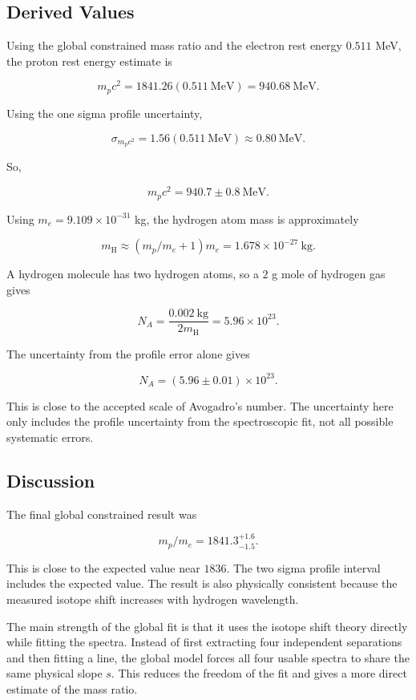 \documentclass[11pt]{article}
\begin{document}
\subsection{Derived Values}

Using the global constrained mass ratio and the electron rest energy \(0.511\) MeV, the proton rest energy estimate is

\[
m_p c^2
=
1841.26(0.511 \ \mathrm{MeV})
=
940.68 \ \mathrm{MeV}.
\]

Using the one sigma profile uncertainty,

\[
\sigma_{m_p c^2}
=
1.56(0.511 \ \mathrm{MeV})
\approx
0.80 \ \mathrm{MeV}.
\]

So,

\[
m_p c^2 = 940.7 \pm 0.8 \ \mathrm{MeV}.
\]

Using \(m_e = 9.109\times10^{-31}\) kg, the hydrogen atom mass is approximately

\[
m_{\mathrm{H}}
\approx
(m_p/m_e+1)m_e
=
1.678\times10^{-27} \ \mathrm{kg}.
\]

A hydrogen molecule has two hydrogen atoms, so a \(2\) g mole of hydrogen gas gives

\[
N_A
=
\frac{0.002 \ \mathrm{kg}}{2m_{\mathrm{H}}}
=
5.96\times10^{23}.
\]

The uncertainty from the profile error alone gives

\[
N_A = (5.96 \pm 0.01)\times10^{23}.
\]

This is close to the accepted scale of Avogadro's number. The uncertainty here only includes the profile uncertainty from the spectroscopic fit, not all possible systematic errors.

\subsection{Discussion}

The final global constrained result was

\[
m_p/m_e = 1841.3^{+1.6}_{-1.5}.
\]

This is close to the expected value near \(1836\). The two sigma profile interval includes the expected value. The result is also physically consistent because the measured isotope shift increases with hydrogen wavelength.

The main strength of the global fit is that it uses the isotope shift theory directly while fitting the spectra. Instead of first extracting four independent separations and then fitting a line, the global model forces all four usable spectra to share the same physical slope \(s\). This reduces the freedom of the fit and gives a more direct estimate of the mass ratio.
\end{document}
